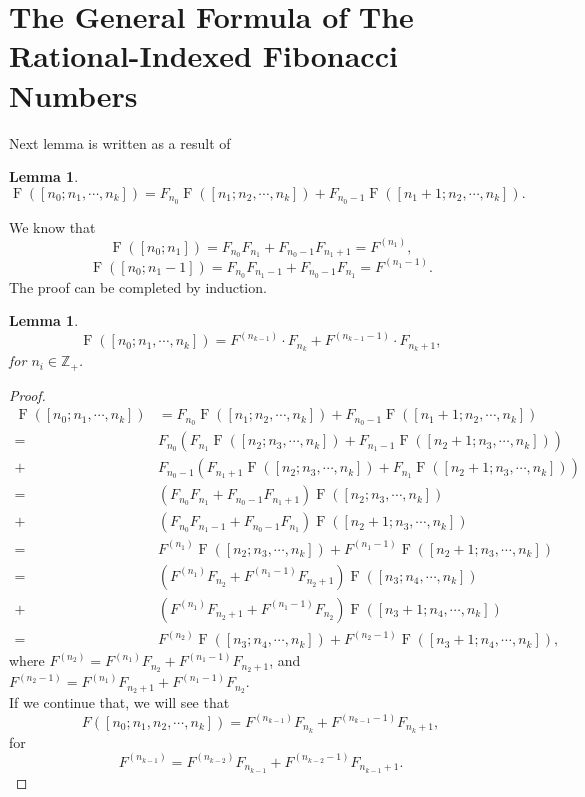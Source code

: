 \documentclass[11pt,reqno]{amsart}
\numberwithin{equation}{section}
\numberwithin{table}{section}
\numberwithin{figure}{section}
\newcommand{\Z}{\mathbb{Z}}
\DeclareMathOperator{\F}{F}
\theoremstyle{plain}
\newtheorem{lemma}[thm]{Lemma}
\theoremstyle{definition}
\theoremstyle{remark}
\begin{document}
	\section{The General Formula of The Rational-Indexed Fibonacci Numbers}Next lemma is written as a result of \cite[prop.~4]{ULUDAG2022103192}
	\begin{lemma}	\begin{equation*}		\F([n_0; n_1, \cdots, n_k]) = F_{n_0}\F([n_1; n_2,\cdots, n_k]) + F_{n_0-1}\F([n_1+1; n_2,\cdots, n_k]).	\end{equation*}\end{lemma}We know that	\begin{equation*}		\F([n_0; n_1]) = F_{n_0}F_{n_1} + F_{n_0-1}F_{n_1+1} = F^{(n_1)},	\end{equation*}	\begin{equation*}		\F([n_0; n_1-1]) = F_{n_0}F_{n_1-1} + F_{n_0-1}F_{n_1} = F^{(n_1-1)}.	\end{equation*}	The proof can be completed by induction.	\begin{lemma}		\begin{equation*}		\F([n_0; n_1,\cdots, n_k]) = F^{(n_{k-1})}\cdot F_{n_k} + F^{(n_{k-1}-1)}\cdot F_{n_k+1},		\end{equation*}		for $n_i\in\Z_+$.	\end{lemma}		\begin{proof}		\begin{align*}				\F([n_0; n_1, \cdots, n_k]) &= F_{n_0}\F([n_1; n_2,\cdots, n_k]) + F_{n_0-1}\F([n_1+1; n_2,\cdots, n_k])\\				=&F_{n_0}(F_{n_1}\F([n_2; n_3,\cdots, n_k]) + F_{n_1-1}\F([n_2+1; n_3,\cdots, n_k]))\\				+& F_{n_0-1}(F_{n_1+1}\F([n_2; n_3,\cdots, n_k]) + F_{n_1}\F([n_2+1; n_3,\cdots, n_k]))\\				=& (F_{n_0}F_{n_1} + F_{n_0-1}F_{n_1+1})\F([n_2; n_3,\cdots, n_k]) \\				+& ( F_{n_0}F_{n_1-1} + F_{n_0-1}F_{n_1} )\F([n_2+1; n_3,\cdots, n_k])\\				= & F^{(n_1)}\F([n_2; n_3,\cdots, n_k]) + F^{(n_1-1)}\F([n_2+1; n_3,\cdots, n_k])\\				= & (F^{(n_1)}F_{n_2} + F^{(n_1-1)}F_{n_2+1})\F([n_3; n_4,\cdots, n_k])\\				+& (F^{(n_1)}F_{n_2+1} + F^{(n_1-1)}F_{n_2})\F([n_3+1; n_4,\cdots, n_k])\\				=&F^{(n_2)}\F([n_3; n_4,\cdots, n_k]) + F^{(n_2-1)}\F([n_3+1; n_4,\cdots, n_k]),		\end{align*}where $F^{(n_2)} = F^{(n_1)}F_{n_2} + F^{(n_1-1)}F_{n_2+1}$, and $F^{(n_2-1)} = F^{(n_1)}F_{n_2+1} + F^{(n_1-1)}F_{n_2}$. \\If we continue that, we will see that \begin{equation}	F([n_0; n_1, n_2,\cdots, n_k]) = F^{(n_{k-1})}F_{n_k} + F^{(n_{k-1}-1)}F_{n_k+1},\end{equation}for \begin{equation*}	F^{(n_{k-1})} = F^{(n_{k-2})}F_{n_{k-1}} + F^{(n_{k-2}-1)}F_{n_{k-1}+1}.\end{equation*}\end{proof}
\end{document}
